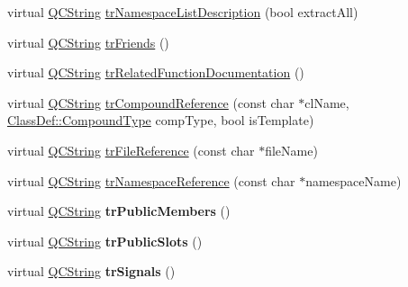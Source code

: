 \begin{DoxyCompactItemize}
\item 
virtual \mbox{\hyperlink{class_q_c_string}{Q\+C\+String}} \mbox{\hyperlink{class_translator_serbian_cyrillic_a572d5bad2f4a6a6fb957a32564df04b3}{tr\+Namespace\+List\+Description}} (bool extract\+All)
\item 
virtual \mbox{\hyperlink{class_q_c_string}{Q\+C\+String}} \mbox{\hyperlink{class_translator_serbian_cyrillic_a4347ef3d65f6e7b2bd85a6ca83d40ebb}{tr\+Friends}} ()
\item 
virtual \mbox{\hyperlink{class_q_c_string}{Q\+C\+String}} \mbox{\hyperlink{class_translator_serbian_cyrillic_a2e3d8cfd9d451d1bd0a7ee449aadbf2f}{tr\+Related\+Function\+Documentation}} ()
\item 
virtual \mbox{\hyperlink{class_q_c_string}{Q\+C\+String}} \mbox{\hyperlink{class_translator_serbian_cyrillic_a798d2b6dc09bed21a980947f3fc5676a}{tr\+Compound\+Reference}} (const char $\ast$cl\+Name, \mbox{\hyperlink{class_class_def_ae70cf86d35fe954a94c566fbcfc87939}{Class\+Def\+::\+Compound\+Type}} comp\+Type, bool is\+Template)
\item 
virtual \mbox{\hyperlink{class_q_c_string}{Q\+C\+String}} \mbox{\hyperlink{class_translator_serbian_cyrillic_a5b07bccc45c0ecb20569c0e7498be85b}{tr\+File\+Reference}} (const char $\ast$file\+Name)
\item 
virtual \mbox{\hyperlink{class_q_c_string}{Q\+C\+String}} \mbox{\hyperlink{class_translator_serbian_cyrillic_aadf4c3fce77f99128f445a464855e81e}{tr\+Namespace\+Reference}} (const char $\ast$namespace\+Name)
\item 
\mbox{\label{class_translator_serbian_cyrillic_a2ccfeaab9aca225ccce1167126e935c6}} 
virtual \mbox{\hyperlink{class_q_c_string}{Q\+C\+String}} {\bfseries tr\+Public\+Members} ()
\item 
\mbox{\label{class_translator_serbian_cyrillic_a8224dae70fc7f4d7e72d0865cc917096}} 
virtual \mbox{\hyperlink{class_q_c_string}{Q\+C\+String}} {\bfseries tr\+Public\+Slots} ()
\item 
\mbox{\label{class_translator_serbian_cyrillic_a1cf6d4b03ebf73e57b8f58bf7e806ed3}} 
virtual \mbox{\hyperlink{class_q_c_string}{Q\+C\+String}} {\bfseries tr\+Signals} ()
\item 
\mbox{\label{class_translator_serbian_cyrillic_a2847c6864488932b7f3208952c7ca398}} 

\end{DoxyCompactItemize}
